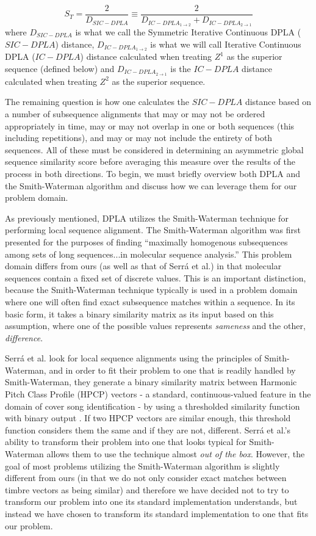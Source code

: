 \documentclass[a4paper,12pt]{report} 	%
\numberwithin{figure}{chapter}
\numberwithin{table}{chapter}
\numberwithin{equation}{chapter}
\begin{document}
\begin{flushleft}
\begin{equation}
S_T = \frac{2}{D_{SIC-DPLA}} \equiv \frac{2}{D_{IC-DPLA_{1\to2}} + D_{IC-DPLA_{2\to1}}}
\end{equation}
where $D_{SIC-DPLA}$ is what we call the Symmetric Iterative Continuous DPLA ($SIC-DPLA$) distance, $D_{IC-DPLA_{1\to2}}$ is what we will call Iterative Continuous DPLA ($IC-DPLA$) distance calculated when treating $Z^1$ as the superior sequence (defined below) and $D_{IC-DPLA_{2\to1}}$ is the $IC-DPLA$ distance calculated when treating $Z^2$ as the superior sequence.

The remaining question is how one calculates the $SIC-DPLA$ distance based on a number of subsequence alignments that may or may not be ordered appropriately in time, may or may not overlap in one or both sequences (this including repetitions), and may or may not include the entirety of both sequences. All of these must be considered in determining an asymmetric global sequence similarity score before averaging this measure over the results of the process in both directions. To begin, we must briefly overview both DPLA and the Smith-Waterman algorithm and discuss how we can leverage them for our problem domain.

As previously mentioned, DPLA utilizes the Smith-Waterman technique for performing local sequence alignment. The Smith-Waterman algorithm was first presented for the purposes of  finding ``maximally homogenous subsequences among sets of long sequences...in molecular sequence analysis.'' This problem domain differs from ours (as well as that of Serr\'a et al.) in that molecular sequences contain a fixed set of discrete values. This is an important distinction, because the Smith-Waterman technique typically is used in a problem domain where one will often find exact subsequence matches within a sequence. In its basic form, it takes a binary similarity matrix as its input based on this assumption, where one of the possible values represents \emph{sameness} and the other, \emph{difference}.

Serr\'a et al. look for local sequence alignments using the principles of Smith-Waterman, and in order to fit their problem to one that is readily handled by Smith-Waterman, they generate a binary similarity matrix between Harmonic Pitch Class Profile (HPCP) vectors - a standard, continuous-valued feature in the domain of cover song identification - by using a thresholded similarity function with binary output \cite{serra2008chroma}. If two HPCP vectors are similar enough, this threshold function considers them the same and if they are not, different. Serr\'a et al.'s ability to transform their problem into one that looks typical for Smith-Waterman allows them to use the technique almost \emph{out of the box}.  However, the goal of most problems utilizing the Smith-Waterman algorithm is slightly different from ours (in that we do not only consider exact matches between timbre vectors as being similar) and therefore we have decided not to try to transform our problem into one its standard implementation understands, but instead we have chosen to transform its standard implementation to one that fits our problem.


\end{flushleft}
\end{document}
